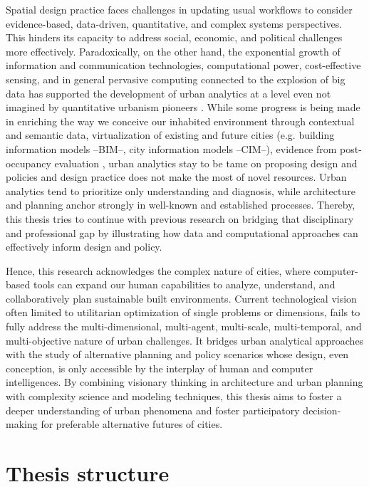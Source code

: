 Spatial design practice faces challenges in updating usual workflows to consider evidence-based, data-driven, quantitative, and complex systems perspectives. This hinders its capacity to address social, economic, and political challenges more effectively. Paradoxically, on the other hand, the exponential growth of information and communication technologies, computational power, cost-effective sensing, and in general pervasive computing connected to the explosion of big data has supported the development of urban analytics at a level even not imagined by quantitative urbanism pioneers \citep{Whyte1979}. While some progress is being made in enriching the way we conceive our inhabited environment through contextual and semantic data, virtualization of existing and future cities (e.g. building information models --BIM--, city information models --CIM--), evidence from post-occupancy evaluation \citep{Lei2023,Xue2021}, urban analytics stay to be tame on proposing design and policies and design practice does not make the most of novel resources. Urban analytics tend to prioritize only understanding and diagnosis, while architecture and planning anchor strongly in well-known and established processes. Thereby, this thesis tries to continue with previous research \citep{DelsoGutierrez2018,ArgotaSanchez-Vaquerizo2018} on bridging that disciplinary and professional gap by illustrating how data and computational approaches can effectively inform design and policy.

Hence, this research acknowledges the complex nature of cities, where computer-based tools can expand our human capabilities to analyze, understand, and collaboratively plan sustainable built environments. Current technological vision often limited to utilitarian optimization of single problems or dimensions, fails to fully address the multi-dimensional, multi-agent, multi-scale, multi-temporal, and multi-objective nature of urban challenges. It bridges urban analytical approaches with the study of alternative planning and policy scenarios whose design, even conception, is only accessible by the interplay of human and computer intelligences. By combining visionary thinking in architecture and urban planning with complexity science and modeling techniques, this thesis aims to foster a deeper understanding of urban phenomena and foster participatory decision-making for preferable alternative futures of cities.

\section{Thesis structure}

